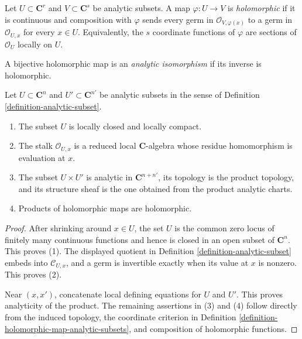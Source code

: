 \begin{definition}
\label{definition-holomorphic-map-analytic-subsets}
\begin{reference}
\cite[\S 1, no. 1, pp. 3--4]{GAGA}
\end{reference}
Let $U \subset \mathbf C^r$ and $V \subset \mathbf C^s$ be analytic
subsets. A map $\varphi:U\to V$ is {\it holomorphic} if it is continuous and
composition with $\varphi$ sends every germ in
$\mathcal O_{V,\varphi(x)}$ to a germ in $\mathcal O_{U,x}$ for every
$x\in U$. Equivalently, the $s$ coordinate functions of $\varphi$ are
sections of $\mathcal O_U$ locally on $U$.

A bijective holomorphic map is an {\it analytic isomorphism} if its inverse
is holomorphic.
\end{definition}

\begin{lemma}
\label{lemma-analytic-subset-basic-properties}
Let $U \subset \mathbf C^n$ and $U' \subset \mathbf C^{n'}$ be analytic
subsets in the sense of Definition \ref{definition-analytic-subset}.
\begin{enumerate}
\item The subset $U$ is locally closed and locally compact.
\item The stalk $\mathcal O_{U,x}$ is a reduced local $\mathbf C$-algebra
whose residue homomorphism is evaluation at $x$.
\item The subset $U\times U'$ is analytic in $\mathbf C^{n+n'}$, its
topology is the product topology, and its structure sheaf is the one obtained
from the product analytic charts.
\item Products of holomorphic maps are holomorphic.
\end{enumerate}
\end{lemma}

\begin{proof}
After shrinking around $x\in U$, the set $U$ is the common zero locus of
finitely many continuous functions and hence is closed in an open subset of
$\mathbf C^n$. This proves (1). The displayed quotient in Definition
\ref{definition-analytic-subset} embeds into $\mathcal C_{U,x}$, and a germ
is invertible exactly when its value at $x$ is nonzero. This proves (2).

Near $(x,x')$, concatenate local defining equations for $U$ and $U'$.
This proves analyticity of the product. The remaining assertions in (3) and
(4) follow directly from the induced topology, the coordinate criterion in
Definition \ref{definition-holomorphic-map-analytic-subsets}, and composition
of holomorphic functions.
\end{proof}


